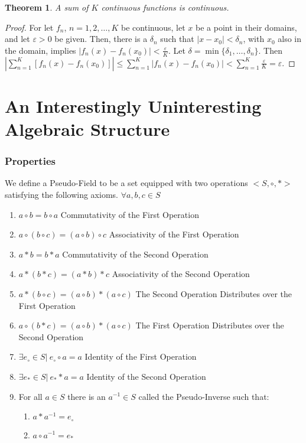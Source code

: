 \documentclass[oneside]{book}
\newtheorem{theorem}{Theorem}[section]
\theoremstyle{definition}
\begin{document}
\begin{theorem}
A sum of $K$ continuous functions is continuous. 
\end{theorem}
\begin{proof}
For let $f_n$, $n=1,2,\hdots,K$ be continuous, let $x$ be a point in their domains, and let $\varepsilon>0$ be given. Then, there is a $\delta_n$ such that $|x-x_0|<\delta_n$, with $x_0$ also in the domain, implies $|f_n(x)-f_n(x_0)|<\frac{\varepsilon}{K}$. Let $\delta = \min\{\delta_1,\hdots,\delta_n\}$. Then $|\sum_{n=1}^{K}[f_n(x)-f_n(x_0)]| \leq \sum_{n=1}^{K}|f_n(x)-f_n(x_0)| < \sum_{n=1}^{K} \frac{\varepsilon}{K} = \varepsilon$.
\end{proof}

\section{An Interestingly Uninteresting Algebraic Structure}
\subsubsection{Properties}
\noindent We define a Pseudo-Field to be a set equipped with two operations $<S,\circ, *>$ satisfying the following axioms.
$\forall a,b,c \in S$
\begin{enumerate}
\item $a\circ b = b\circ a$ \hfill Commutativity of the First Operation
\item $a\circ (b\circ c)=(a \circ b)\circ c$ \hfill Associativity of the First Operation
\item $a*b = b*a$ \hfill Commutativity of the Second Operation
\item $a*(b*c) = (a*b)*c$ \hfill Associativity of the Second Operation
\item $a*(b\circ c)=(a\circ b)*(a\circ c)$ \hfill The Second Operation Distributes over the First Operation
\item $a\circ (b*c) = (a\circ b)*(a\circ c)$ \hfill The First Operation Distributes over the Second Operation
\item $\exists e_{\circ}\in S|\ e_{\circ}\circ a = a$ \hfill Identity of the First Operation
\item $\exists e_{*} \in S|\ e_{*}*a = a$ \hfill Identity of the Second Operation
\item For all $a\in S$ there is an $a^{-1}\in S$ called the Pseudo-Inverse such that:
\begin{enumerate}
\item $a*a^{-1} = e_{\circ}$
\item $a\circ a^{-1}=e_{*}$
\end{enumerate}
\end{enumerate}
\end{document}

